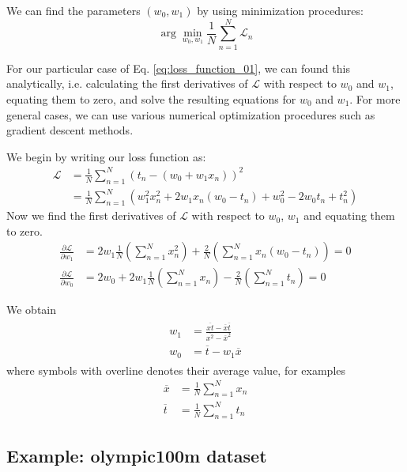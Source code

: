 We can find the parameters $(w_{0},w_{1})$ by using minimization procedures:
\begin{equation}
\arg\min_{w_{0},w_{1}} \frac{1}{N} \sum_{n=1}^{N} \mathcal{L}_{n}
\end{equation}

For our particular case of Eq. \eqref{eq:loss_function_01}, we can found this analytically,
i.e. calculating the first derivatives of $\mathcal{L}$ with
respect to $w_0$ and $w_1$, equating
them to zero, and solve the resulting equations for $w_0$ and $w_1$.
For more general cases, we can use various numerical optimization procedures such as
gradient descent methods.

We begin by writing our loss function as:
\begin{align*}
\mathcal{L} & = \frac{1}{N} \sum_{n=1}^{N} \left( t_n - (w_0 + w_1 x_{n}) \right)^2 \\
& = \frac{1}{N} \sum_{n=1}^{N} \left( w_1^2 x_n^2 + 2w_{1}x_{n}(w_0 - t_n) + w_0^2 - 2w_0 t_n + t_n^2 \right)
\end{align*}
%
Now we find the first derivatives of $\mathcal{L}$ with respect to
$w_0$, $w_1$ and equating them to zero.
\begin{align*}
\frac{\partial\mathcal{L}}{\partial w_1} & = 2w_1 \frac{1}{N} \left( \sum_{n=1}^{N} x_n^2 \right) +
\frac{2}{N} \left( \sum_{n=1}^{N} x_{n} (w_0 - t_n) \right) = 0 \\
\frac{\partial \mathcal{L}}{\partial w_0} & = 2w_0 + 2w_1 \frac{1}{N} \left( \sum_{n=1}^{N} x_n \right) -
\frac{2}{N} \left( \sum_{n=1}^{N} t_n \right) = 0
\end{align*}

We obtain
\begin{align}
\begin{split}
w_{1} & = \frac{\overline{xt} - \overline{x}\overline{t}}{\overline{x^2} - \overline{x}^2} \\
w_{0} & = \overline{t} - w_{1} \overline{x}
\end{split}
\label{eq:w0_w1_simple}
\end{align}
where symbols with overline denotes their average value, for examples
\begin{align*}
\overline{x} & = \frac{1}{N} \sum_{n=1}^{N} x_{n} \\
\overline{t} & = \frac{1}{N} \sum_{n=1}^{N} t_{n}
\end{align*}

\subsection{Example: olympic100m dataset}

